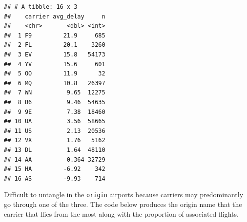\documentclass[]{book}
\newenvironment{Shaded}{\begin{snugshade}}{\end{snugshade}}
\newcommand{\DataTypeTok}[1]{\textcolor[rgb]{0.13,0.29,0.53}{#1}}
\newcommand{\DecValTok}[1]{\textcolor[rgb]{0.00,0.00,0.81}{#1}}
\newcommand{\KeywordTok}[1]{\textcolor[rgb]{0.13,0.29,0.53}{\textbf{#1}}}
\newcommand{\NormalTok}[1]{#1}
\newcommand{\OperatorTok}[1]{\textcolor[rgb]{0.81,0.36,0.00}{\textbf{#1}}}
\newcommand{\StringTok}[1]{\textcolor[rgb]{0.31,0.60,0.02}{#1}}
\theoremstyle{definition}
\theoremstyle{definition}
\theoremstyle{definition}
\theoremstyle{remark}
\begin{document}
\begin{verbatim}
## # A tibble: 16 x 3
##    carrier avg_delay     n
##    <chr>       <dbl> <int>
##  1 F9         21.9     685
##  2 FL         20.1    3260
##  3 EV         15.8   54173
##  4 YV         15.6     601
##  5 OO         11.9      32
##  6 MQ         10.8   26397
##  7 WN          9.65  12275
##  8 B6          9.46  54635
##  9 9E          7.38  18460
## 10 UA          3.56  58665
## 11 US          2.13  20536
## 12 VX          1.76   5162
## 13 DL          1.64  48110
## 14 AA          0.364 32729
## 15 HA         -6.92    342
## 16 AS         -9.93    714
\end{verbatim}

Difficult to untangle in the \texttt{origin} airports because carriers
may predominantly go through one of the three. The code below produces
the origin name that the carrier that flies from the most along with the
proportion of associated flights.

\begin{Shaded}
\end{Shaded}
\end{document}
